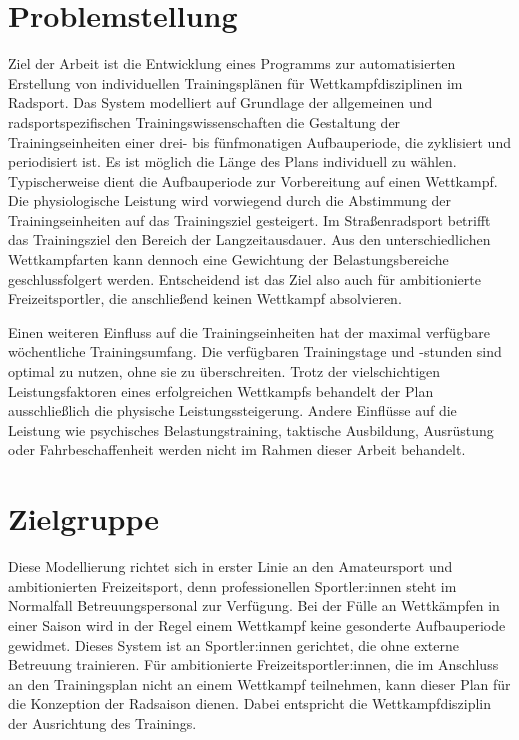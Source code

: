 \section{Problemstellung}
\label{sec:einleitung:problem}
Ziel der Arbeit ist die Entwicklung eines Programms zur automatisierten Erstellung von individuellen Trainingsplänen für Wettkampfdisziplinen im Radsport.
Das System modelliert auf Grundlage der allgemeinen und radsportspezifischen Trainingswissenschaften die Gestaltung der Trainingseinheiten einer drei- bis fünfmonatigen Aufbauperiode, die zyklisiert und periodisiert ist. Es ist möglich die Länge des Plans individuell zu wählen.
Typischerweise dient die Aufbauperiode zur Vorbereitung auf einen Wettkampf. Die physiologische Leistung wird vorwiegend durch die Abstimmung der Trainingseinheiten auf das Trainingsziel gesteigert. Im Straßenradsport betrifft das Trainingsziel den Bereich der Langzeitausdauer. Aus den unterschiedlichen Wettkampfarten kann dennoch eine Gewichtung der Belastungsbereiche geschlussfolgert werden. Entscheidend ist das Ziel also auch für ambitionierte Freizeitsportler, die anschließend keinen Wettkampf absolvieren.\par
Einen weiteren Einfluss auf die Trainingseinheiten hat der maximal verfügbare wöchentliche Trainingsumfang. Die verfügbaren Trainingstage und -stunden sind optimal zu nutzen, ohne sie zu überschreiten. 
Trotz der vielschichtigen Leistungsfaktoren eines erfolgreichen Wettkampfs behandelt der Plan ausschließlich die physische Leistungssteigerung. Andere Einflüsse auf die Leistung wie psychisches Belastungstraining, taktische Ausbildung, Ausrüstung oder Fahrbeschaffenheit \cite[13-15]{Radsporttraining} werden nicht im Rahmen dieser Arbeit behandelt.

\section{Zielgruppe}
Diese Modellierung richtet sich in erster Linie an den Amateursport und ambitionierten Freizeitsport, denn professionellen Sportler:innen steht im Normalfall Betreuungspersonal zur Verfügung. Bei der Fülle an Wettkämpfen in einer Saison wird in der Regel einem Wettkampf keine gesonderte Aufbauperiode gewidmet. Dieses System ist an Sportler:innen gerichtet, die ohne externe Betreuung trainieren. Für ambitionierte Freizeitsportler:innen, die im Anschluss an den Trainingsplan nicht an einem Wettkampf teilnehmen, kann dieser Plan für die Konzeption der Radsaison dienen. Dabei entspricht die Wettkampfdisziplin der Ausrichtung des Trainings.


